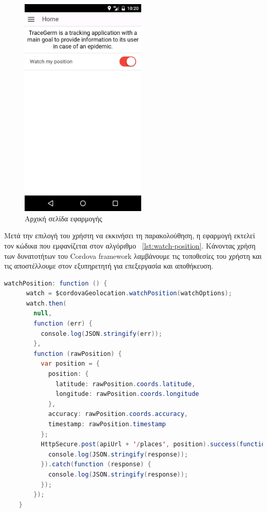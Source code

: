 \begin{figure}[h]
  \centering
  \includegraphics[width=60mm]{images/watch-position.png}
  \caption{Αρχική σελίδα εφαρμογής}
  \label{fig:watch-position}
\end{figure}

\newpage

Μετά την επιλογή του χρήστη να εκκινήσει τη παρακολούθηση, η εφαρμογή εκτελεί τον κώδικα που εμφανίζεται στον αλγόριθμο ~\ref{lst:watch-position}. Κάνοντας χρήση των δυνατοτήτων του Cordova framework λαμβάνουμε τις τοποθεσίες του χρήστη και τις αποστέλλουμε στον εξυπηρετητή για επεξεργασία και αποθήκευση.

\begin{lstlisting}[language=Java, caption=Παρακολούθηση τοποθεσιών, label={lst:watch-position}]
watchPosition: function () {
      watch = $cordovaGeolocation.watchPosition(watchOptions);
      watch.then(
        null,
        function (err) {
          console.log(JSON.stringify(err));
        },
        function (rawPosition) {
          var position = {
            position: {
              latitude: rawPosition.coords.latitude,
              longitude: rawPosition.coords.longitude
            },
            accuracy: rawPosition.coords.accuracy,
            timestamp: rawPosition.timestamp
          };
          HttpSecure.post(apiUrl + '/places', position).success(function (response) {
            console.log(JSON.stringify(response));
          }).catch(function (response) {
            console.log(JSON.stringify(response));
          });
        });
    }
\end{lstlisting}

